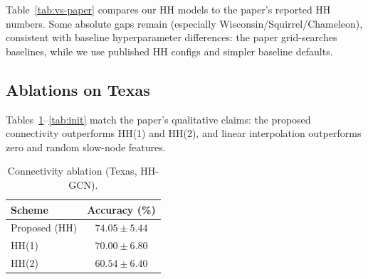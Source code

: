 \documentclass[11pt,a4paper]{article}
\begin{document}
Table~\ref{tab:vs-paper} compares our HH models to the paper's reported HH
numbers.
Some absolute gaps remain (especially Wisconsin/Squirrel/Chameleon),
consistent with baseline hyperparameter differences: the paper grid-searches
baselines, while we use published HH configs and simpler baseline defaults.

\begin{table}[H]
\centering
\caption{HH models vs.\ paper Table~2 (test accuracy \%).}
\label{tab:vs-paper}
\end{table}

\subsection{Ablations on Texas}
Tables~\ref{tab:conn}--\ref{tab:init} match the paper's qualitative claims:
the proposed connectivity outperforms HH(1) and HH(2), and linear
interpolation outperforms zero and random slow-node features.

\begin{table}[H]
\centering
\caption{Connectivity ablation (Texas, HH-GCN).}
\label{tab:conn}
\begin{tabular}{lc}
\toprule
Scheme & Accuracy (\%) \\
\midrule
Proposed (HH) & $74.05{\pm}5.44$ \\
HH(1) & $70.00{\pm}6.80$ \\
HH(2) & $60.54{\pm}6.40$ \\
\bottomrule
\end{tabular}
\end{table}
\end{document}
